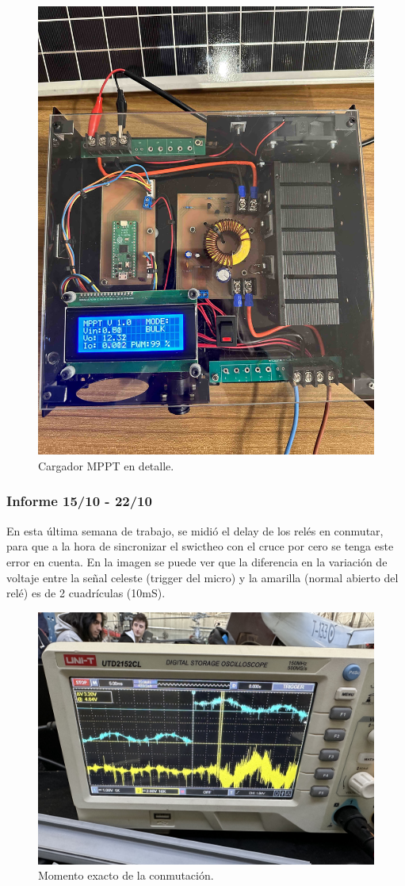 \begin{figure}[H]
    \centering
    \includegraphics[width=0.75\linewidth]{informes/IMG_8032.jpg}
    \caption{Cargador MPPT en detalle.}
    
\end{figure}

\subsubsection{Informe 15/10 - 22/10}

En esta última semana de trabajo, se midió el delay de los relés en conmutar, para que a la hora de sincronizar el swictheo con el cruce por cero se tenga este error en cuenta. En la imagen se puede ver que la diferencia en la variación de voltaje entre la señal celeste (trigger del micro) y la amarilla (normal abierto del relé) es de 2 cuadrículas (10mS).\\
\begin{figure}[H]
    \centering
    \includegraphics[width=0.75\linewidth]{informes/IMG_9443.jpg}
    \caption{Momento exacto de la conmutación.}
\end{figure}

